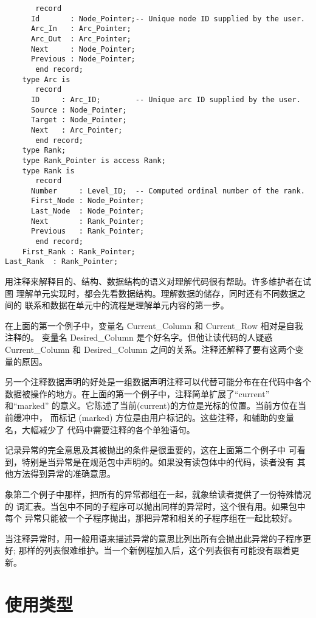 \begin{blockindent}
\begin{lstlisting}
       record
	  Id       : Node_Pointer;-- Unique node ID supplied by the user.
	  Arc_In   : Arc_Pointer;
	  Arc_Out  : Arc_Pointer;
	  Next     : Node_Pointer;
	  Previous : Node_Pointer;
       end record;
    type Arc is
       record
	  ID     : Arc_ID;        -- Unique arc ID supplied by the user.
	  Source : Node_Pointer;
	  Target : Node_Pointer;
	  Next   : Arc_Pointer;
       end record;
    type Rank;
    type Rank_Pointer is access Rank;
    type Rank is
       record
	  Number     : Level_ID;  -- Computed ordinal number of the rank.
	  First_Node : Node_Pointer;
	  Last_Node  : Node_Pointer;
	  Next       : Rank_Pointer;
	  Previous   : Rank_Pointer;
       end record;
    First_Rank : Rank_Pointer;
Last_Rank  : Rank_Pointer;
\end{lstlisting}
\end{blockindent}

\begin{blockindent}
用注释来解释目的、结构、数据结构的语义对理解代码很有帮助。许多维护者在试图
理解单元实现时，都会先看数据结构。理解数据的储存，同时还有不同数据之间的
联系和数据在单元中的流程是理解单元内容的第一步。

在上面的第一个例子中，变量名 Current\_Column 和 Current\_Row 相对是自我注释的。
变量名 Desired\_Column 是个好名字。但他让读代码的人疑惑 Current\_Column 和
Desired\_Column 之间的关系。注释还解释了要有这两个变量的原因。

另一个注释数据声明的好处是一组数据声明注释可以代替可能分布在在代码中各个
数据被操作的地方。在上面的第一个例子中，注释简单扩展了``current'' 和``marked''
的意义。它陈述了当前(current)的方位是光标的位置。当前方位在当前缓冲中，
而标记 (marked) 方位是由用户标记的。这些注释，和辅助的变量名，大幅减少了
代码中需要注释的各个单独语句。

记录异常的完全意思及其被抛出的条件是很重要的，这在上面第二个例子中
可看到，特别是当异常是在规范包中声明的。如果没有读包体中的代码，读者没有
其他方法得到异常的准确意思。

象第二个例子中那样，把所有的异常都组在一起，就象给读者提供了一份特殊情况的
词汇表。当包中不同的子程序可以抛出同样的异常时，这个很有用。如果包中每个
异常只能被一个子程序抛出，那把异常和相关的子程序组在一起比较好。

当注释异常时，用一般用语来描述异常的意思比列出所有会抛出此异常的子程序更好;
那样的列表很难维护。当一个新例程加入后，这个列表很有可能没有跟着更新。

\end{blockindent}

\section{使用类型}

